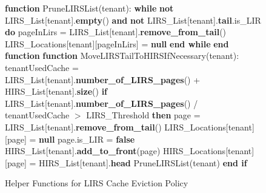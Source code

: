 \begin{figure}[htbp]
    \centering
    \begin{minipage}{\linewidth}
    \begin{algorithm}[H]
        \begin{algorithmic}
            \STATE \textbf{function} PruneLIRSList(tenant):
            \STATE \hspace{\algorithmicindent} \textbf{while} \textbf{not} LIRS\_List[tenant].\textbf{empty}() \textbf{and} \textbf{not} LIRS\_List[tenant].\textbf{tail}.is\_LIR \textbf{do}
            \STATE \hspace{\algorithmicindent} \hspace{\algorithmicindent} pageInLirs = LIRS\_List[tenant].\textbf{remove\_from\_tail}()
            \STATE \hspace{\algorithmicindent} \hspace{\algorithmicindent} LIRS\_Locations[tenant][pageInLirs] = \textbf{null}
            \STATE \hspace{\algorithmicindent} \textbf{end while}
            \STATE \textbf{end function}
            \STATE
            \STATE \textbf{function} MoveLIRSTailToHIRSIfNecessary(tenant):
            \STATE \hspace{\algorithmicindent} tenantUsedCache = LIRS\_List[tenant].\textbf{number\_of\_LIRS\_pages}() + HIRS\_List[tenant].\textbf{size}()
            \STATE \hspace{\algorithmicindent} \textbf{if} LIRS\_List[tenant].\textbf{number\_of\_LIRS\_pages}() / tenantUsedCache $>$ LIRS\_Threshold \textbf{then}
            \STATE \hspace{\algorithmicindent} \hspace{\algorithmicindent} page = LIRS\_List[tenant].\textbf{remove\_from\_tail}()
            \STATE \hspace{\algorithmicindent} \hspace{\algorithmicindent} LIRS\_Locations[tenant][page] = \textbf{null}
            \STATE \hspace{\algorithmicindent} \hspace{\algorithmicindent} page.is\_LIR = \textbf{false}
            \STATE \hspace{\algorithmicindent} \hspace{\algorithmicindent} HIRS\_List[tenant].\textbf{add\_to\_front}(page)
            \STATE \hspace{\algorithmicindent} \hspace{\algorithmicindent} HIRS\_Locations[tenant][page] = HIRS\_List[tenant].\textbf{head}
            \STATE \hspace{\algorithmicindent} \hspace{\algorithmicindent} PruneLIRSList(tenant)
            \STATE \hspace{\algorithmicindent} \textbf{end if}
        \end{algorithmic}
    \end{algorithm}
    \caption{Helper Functions for LIRS Cache Eviction Policy}
    \label{fig:lirs-helper}
    \end{minipage}
\end{figure}

